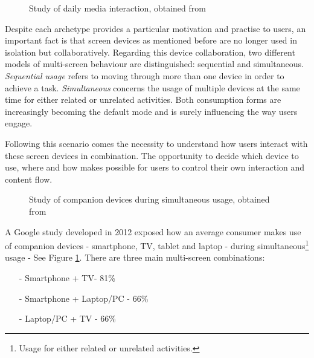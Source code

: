 \documentclass{acm_proc_article-sp}
\begin{document}
\begin{figure}[!htb]
\centering
{}
\caption{Study of daily media interaction, obtained from \cite{multiscreen:google}}
\end{figure}

Despite each archetype provides a particular motivation and practise to users, an important fact is that screen devices as mentioned before are no longer used in isolation but collaboratively. Regarding this device collaboration, two different models of multi-screen\cite{multiscreen:google} behaviour are distinguished:  sequential and simultaneous. \textit{Sequential usage} refers to moving through more than one device in order to achieve a task. \textit{Simultaneous} concerns the usage of multiple devices at the same time for either related or unrelated activities. Both consumption forms are increasingly becoming the default mode and is surely influencing the way users engage. 

Following this scenario comes the necessity to understand how users interact with these screen devices in combination\cite{hritzuk2014multiscreen}. The opportunity to decide which device to use, where and how makes possible for users to control their own interaction and content flow. 

\begin{figure}[!htb]
	\centering
	\caption{Study of companion devices during simultaneous	 usage, obtained from \cite{multiscreen:google}}
	\label{fig:simultaneous}
\end{figure}

A Google study developed in 2012 \cite{multiscreen:google} exposed how an average consumer makes use of companion devices - smartphone, TV, tablet and laptop - during simultaneous\footnote{Usage for either related or unrelated activities.} usage - See Figure \ref{fig:simultaneous}. There are three main multi-screen combinations:
\begin{itemize}
  \item[-] Smartphone + TV\hspace{1.35cm}- 81\% 
  \item[-] Smartphone + Laptop/PC \hspace{0.1cm}- 66\% 
  \item[-] Laptop/PC  + TV\hspace{1.35cm} - 66\% 
\end{itemize}
\end{document}
